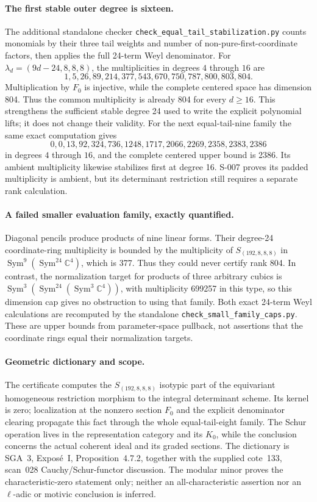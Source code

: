 \paragraph{The first stable outer degree is sixteen.}
The additional standalone checker
\texttt{check\_equal\_tail\_stabilization.py} counts monomials by
their three tail weights and number of non-pure-first-coordinate
factors, then applies the full 24-term Weyl denominator.  For
$\lambda_d=(9d-24,8,8,8)$, the multiplicities in degrees $4$ through
$16$ are
\[
       1,5,26,89,214,377,543,670,750,787,800,803,804.
\]
Multiplication by $F_0$ is injective, while the complete centered
space has dimension 804.  Thus the common multiplicity is already
804 for every $d\geq16$.  This strengthens the sufficient stable
degree 24 used to write the explicit polynomial lifts; it does not
change their validity.
For the next equal-tail-nine family the same exact computation gives
\[
       0,0,13,92,324,736,1248,1717,2066,2269,2358,2383,2386
\]
in degrees $4$ through $16$, and the complete centered upper bound
is 2386.  Its ambient multiplicity likewise stabilizes first at
degree 16.  S-007 proves its padded multiplicity is ambient, but
its determinant restriction still requires a separate rank calculation.

\paragraph{A failed smaller evaluation family, exactly quantified.}
Diagonal pencils produce products of nine linear forms.  Their
degree-24 coordinate-ring multiplicity is bounded by the multiplicity
of $S_{(192,8,8,8)}$ in
$\operatorname{Sym}^9(\operatorname{Sym}^{24}\mathbb C^4)$, which is
377.  Thus they could never certify rank 804.  In contrast, the
normalization target for products of three arbitrary cubics is
$\operatorname{Sym}^3(\operatorname{Sym}^{24}
(\operatorname{Sym}^3\mathbb C^4))$, with multiplicity 699257 in this
type, so this dimension cap gives no obstruction to using that family.
Both exact 24-term Weyl calculations are recomputed by the standalone
\texttt{check\_small\_family\_caps.py}.  These are upper bounds from
parameter-space pullback, not assertions that the coordinate rings
equal their normalization targets.

\paragraph{Geometric dictionary and scope.}
The certificate computes the $S_{(192,8,8,8)}$ isotypic part of the
equivariant homogeneous restriction morphism to the integral determinant
scheme.  Its kernel is zero; localization at the nonzero section $F_0$
and the explicit denominator clearing propagate this fact through the
whole equal-tail-eight family.  The Schur operation lives in the
representation category and its $K_0$, while the conclusion concerns
the actual coherent ideal and its graded sections.  The dictionary is
SGA~3, Expos\'e~I, Proposition~4.7.2, together with the supplied
cote~133, scan~028 Cauchy/Schur-functor discussion.  The modular minor
proves the characteristic-zero statement only; neither an
all-characteristic assertion nor an $\ell$-adic or motivic conclusion
is inferred.

